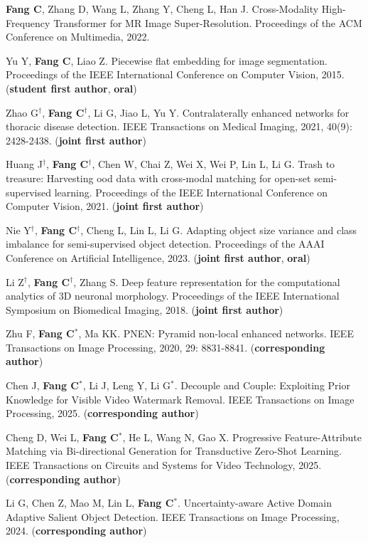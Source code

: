 \documentclass[a4paper,36pt]{article}
\newcommand{\tb}[1]{\textbf{#1}}
\newcommand{\resumeItemWithoutTitle}[1]{
  \item\justifying\small{
    {#1 \vspace{-2pt}}
  }
}
\begin{document}
\resumeItemWithoutTitle{\textbf{Fang C}, Zhang D, Wang L, Zhang Y, Cheng L, Han J. Cross-Modality High-Frequency Transformer for MR Image Super-Resolution. Proceedings of the ACM Conference on Multimedia, 2022. }

\resumeItemWithoutTitle{Yu Y, \tb{Fang C}, Liao Z. Piecewise flat embedding for image segmentation. Proceedings of the IEEE International Conference on Computer Vision, 2015. (\tb{student first author}, \tb{oral})}

\resumeItemWithoutTitle{Zhao G$^\dag$, \tb{Fang C}$^\dag$, Li G, Jiao L, Yu Y. Contralaterally enhanced networks for thoracic disease detection. IEEE Transactions on Medical Imaging, 2021, 40(9): 2428-2438. (\tb{joint first author}) }

\resumeItemWithoutTitle{Huang J$^\dag$, \tb{Fang C}$^\dag$, Chen W, Chai Z, Wei X, Wei P, Lin L, Li G. Trash to treasure: Harvesting ood data with cross-modal matching for open-set semi-supervised learning. Proceedings of the IEEE International Conference on Computer Vision, 2021. (\tb{joint first author})}

\resumeItemWithoutTitle{Nie Y$^{\dag}$, \tb{Fang C}$^{\dag}$, Cheng L, Lin L, Li G. Adapting object size variance and class imbalance for semi-supervised object detection. Proceedings of the AAAI Conference on Artificial Intelligence, 2023. (\tb{joint first author}, \tb{oral})}

\resumeItemWithoutTitle{Li Z$^\dag$, \tb{Fang C}$^\dag$, Zhang S. Deep feature representation for the computational analytics of 3D neuronal morphology. Proceedings of the IEEE International Symposium on Biomedical Imaging, 2018. (\tb{joint first author})}

\resumeItemWithoutTitle{Zhu F, \tb{Fang C}$^\ast$, Ma KK. PNEN: Pyramid non-local enhanced networks. IEEE Transactions on Image Processing, 2020, 29: 8831-8841. (\tb{corresponding author})}

\resumeItemWithoutTitle{Chen J, \tb{Fang C}$^\ast$, Li J, Leng Y, Li G$^\ast$. Decouple and Couple: Exploiting Prior Knowledge for Visible Video Watermark Removal. IEEE Transactions on Image Processing, 2025. (\tb{corresponding author})}

\resumeItemWithoutTitle{Cheng D, Wei L, \tb{Fang C}$^\ast$, He L, Wang N, Gao X. Progressive Feature-Attribute Matching via Bi-directional Generation for Transductive Zero-Shot Learning. IEEE Transactions on Circuits and Systems for Video Technology, 2025. (\tb{corresponding author})}

\resumeItemWithoutTitle{Li G, Chen Z, Mao M, Lin L, \tb{Fang C}$^\ast$. Uncertainty-aware Active Domain Adaptive Salient Object Detection. IEEE Transactions on Image Processing, 2024. (\tb{corresponding author})}
\end{document}
